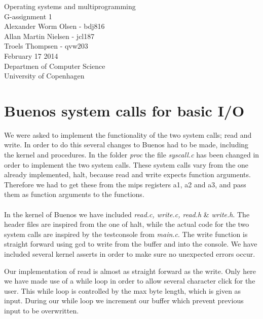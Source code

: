 \documentclass[12pt,a4paper,danish]{article}
\begin{document}
\begin{titlepage}
    \vspace*{\fill}
    \begin{center}
      {\Huge Operating systems and multiprogramming}\\[0.7cm]
      {\huge G-assignment 1}\\[0.7cm]
      {\large Alexander Worm Olsen - bdj816}\\[0.4cm]
      {\large Allan Martin Nielsen - jcl187}\\[0.4cm]
      {\large Troels Thompsen - qvw203}\\[0.4cm]
      {\small February 17 2014}\\[0.3cm] 
      {\small Departmen of Computer Science}\\
      {\small University of Copenhagen}
    \end{center}
    \vspace*{\fill}
\end{titlepage}

\section{Buenos system calls for basic I/O}
We were asked to implement the functionality of the two system calls; read and write. In order to do this several changes to Buenos had to be made, including the kernel and procedures. In the folder \textit{proc} the file \textit{syscall.c} has been changed in order to implement the two system calls. These system calls vary from the one already implemented, halt, because read and write expects function arguments. Therefore we had to get these from the mips registers a1, a2 and a3, and pass them as function arguments to the functions.\\\\
In the kernel of Buenos we have included \textit{read.c, write.c, read.h} \& \textit{write.h}. The header files are inspired from the one of halt, while the actual code for the two system calls are inspired by the testconsole from \textit{main.c}. The write function is straight forward using gcd to write from the buffer and into the console. We have included several kernel asserts in order to make sure no unexpected errors occur.

Our implementation of read is almost as straight forward as the write. Only here we have made use of a while loop in order to allow several character click for the user. This while loop is controlled by the max byte length, which is given as input.
During our while loop we increment our buffer which prevent previous input to be overwritten.
\end{document}
